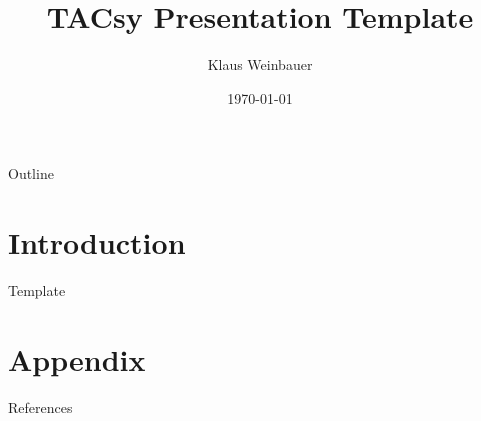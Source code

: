 \documentclass[aspectratio=169]{beamer}
\title[TACsy Presentation Template]{TACsy Presentation Template}
\author{Klaus Weinbauer}
\date{\today}
\institute{Bioinformatik, Institut für Informatik}
\begin{document}
\begin{frame}[plain]
	\maketitle
\end{frame}

\begin{frame}{Outline}
	\tableofcontents
\end{frame}

\section{Introduction}

\begin{frame}{Template}
	
\end{frame}

\insertendpage

\section*{Appendix}
\begin{frame}{References}
	\printbibliography
\end{frame}
\end{document}
